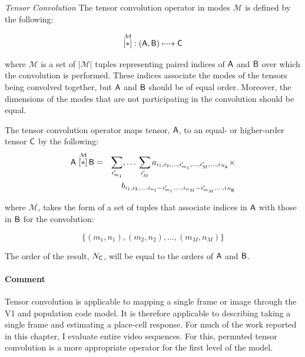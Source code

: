 \begin{definition}{\textit{Tensor Convolution}}\label{def:convop}  The tensor convolution operator in modes $\mathcal{M}$ is defined by the following:

\begin{equation}
 \overset{\mathcal{M}}{[ \ast ]}: \left (\mathsf{A},\mathsf{B}  \right ) \longmapsto \mathsf{C}
\end{equation}

 where $\mathcal{M}$ is a set of $|\mathcal{M}|$ tuples representing paired indices of $\mathsf{A}$ and $\mathsf{B}$ over which the convolution is performed.   These indices associate the modes of the tensors being convolved together, but $\mathsf{A}$ and $\mathsf{B}$ should be of equal order. Moreover, the dimensions of the modes that are not participating in the convolution should be equal.

The tensor convolution operator maps tensor, $\mathsf{A}$, to an equal- or higher-order tensor $\mathsf{C}$ by the following:
\begin{eqnarray}
\mathsf{A}\,\, \overset{\mathcal{M}}{[ \ast ]}\, {\mathsf{B}} &=& \sum_{i'_{m_1}},\ldots\,\sum_{i_{M}'}   
a_{i_1,i_2,...,i_{m_1}',...,i_{M}',...,i_{N_{\mathsf{A}}}} \times \nonumber \\
& &b_{i_1,i_2,...,i_{n_1}-i_{m_1}',...,i_{n_M}-i_{m_M}',...,i_{N_{\mathsf{B}}}}
\label{eq:t1}
\end{eqnarray}

where $\mathcal{M}$, takes the form of a set of tuples that associate indices in $\mathsf{A}$ with those in $\mathsf{B}$ for the convolution:

\begin{equation}
\lbrace(m_1,n_1),(m_2,n_2),...,(m_{M},n_{M})\rbrace
\end{equation}

The order of the result, $N_{\mathsf{C}}$, will be equal to the orders of $\mathsf{A}$ and $\mathsf{B}$.
\end{definition}

\paragraph{Comment}  Tensor convolution is applicable to mapping a single frame or image through the V1 and population code model.  It is therefore applicable to describing taking a single frame and estimating a place-cell response.  For much of the work reported in this chapter, I evaluate entire video sequences. For this, permuted tensor convolution is a more appropriate operator for the first level of the model.

